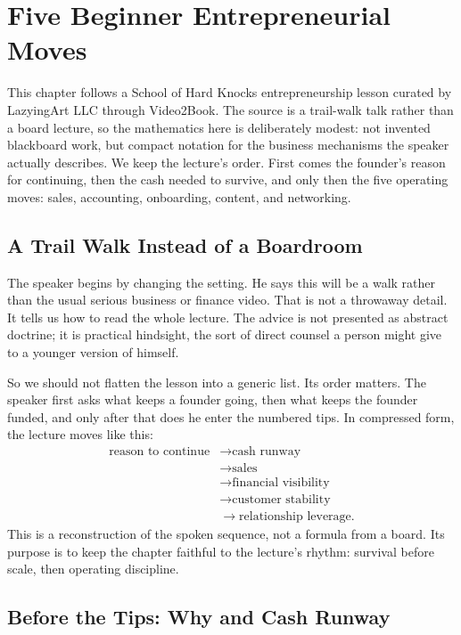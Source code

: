\chapter{Five Beginner Entrepreneurial Moves}

This chapter follows a School of Hard Knocks entrepreneurship lesson curated by LazyingArt LLC through Video2Book. The source is a trail-walk talk rather than a board lecture, so the mathematics here is deliberately modest: not invented blackboard work, but compact notation for the business mechanisms the speaker actually describes. We keep the lecture's order. First comes the founder's reason for continuing, then the cash needed to survive, and only then the five operating moves: sales, accounting, onboarding, content, and networking.

\section{A Trail Walk Instead of a Boardroom}

The speaker begins by changing the setting. He says this will be a walk rather than the usual serious business or finance video. That is not a throwaway detail. It tells us how to read the whole lecture. The advice is not presented as abstract doctrine; it is practical hindsight, the sort of direct counsel a person might give to a younger version of himself.

So we should not flatten the lesson into a generic list. Its order matters. The speaker first asks what keeps a founder going, then what keeps the founder funded, and only after that does he enter the numbered tips. In compressed form, the lecture moves like this:
\[
\begin{aligned}
\text{reason to continue}
&\longrightarrow \text{cash runway} \\
&\longrightarrow \text{sales} \\
&\longrightarrow \text{financial visibility} \\
&\longrightarrow \text{customer stability} \\
&\longrightarrow \text{relationship leverage}.
\end{aligned}
\]
This is a reconstruction of the spoken sequence, not a formula from a board. Its purpose is to keep the chapter faithful to the lecture's rhythm: survival before scale, then operating discipline.

\section{Before the Tips: Why and Cash Runway}

